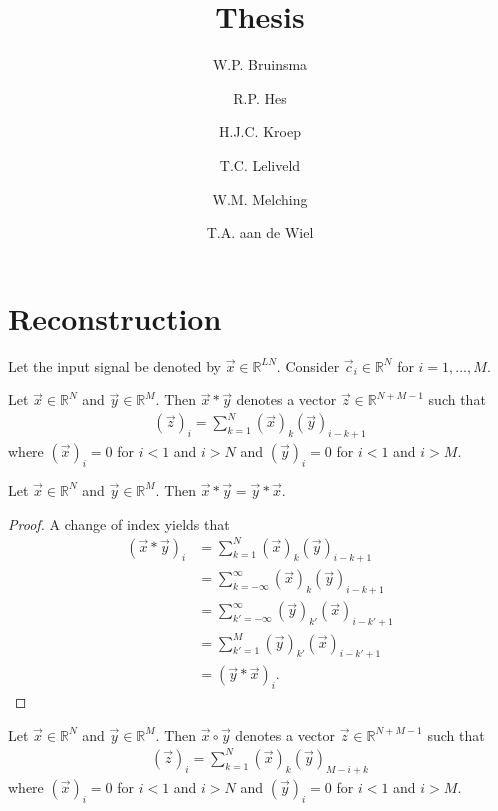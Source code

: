 \documentclass[a4paper, openany, oneside]{memoir}
\title{Thesis}
\author{W.P. Bruinsma \and R.P. Hes \and H.J.C. Kroep \and T.C. Leliveld \and W.M. Melching \and T.A. aan de Wiel}
\begin{document}
\frontmatter

\begin{titlingpage}
  \pagestyle{empty}
  \maketitle
\end{titlingpage}

\chapter{Reconstruction}
Let the input signal be denoted by $\vec{x} \in \mathbb{R}^{LN}$. Consider $\vec{c}_i \in \mathbb{R}^{N}$ for $i = 1,\ldots,M$.

\begin{definition}[Convolution]
    Let $\vec{x} \in \mathbb{R}^N$ and $\vec{y} \in \mathbb{R}^M$. Then $\vec{x} \ast \vec{y}$ denotes a vector $\vec{z} \in \mathbb{R}^{N+M-1}$ such that
    \begin{align*}
        (\vec{z})_i = \sum_{k=1}^{N} (\vec{x})_k (\vec{y})_{i-k+1}
    \end{align*}
    where $(\vec{x})_i=0$ for $i < 1$ and $i > N$ and $(\vec{y})_i=0$ for $i < 1$ and $i > M$.
\end{definition}

\begin{theorem}
    Let $\vec{x} \in \mathbb{R}^N$ and $\vec{y} \in \mathbb{R}^M$. Then $\vec{x} \ast \vec{y} = \vec{y} \ast \vec{x}$.
\end{theorem}
\begin{proof}
    A change of index yields that
    \begin{align*}
        (\vec{x} \ast \vec{y})_i &= \sum_{k=1}^{N} (\vec{x})_k (\vec{y})_{i-k+1} \\
        &= \sum_{k=-\infty}^{\infty} (\vec{x})_k (\vec{y})_{i-k+1} \\
        &= \sum_{k'=-\infty}^{\infty} (\vec{y})_{k'} (\vec{x})_{i-k'+1} \\
        &= \sum_{k'=1}^{M} (\vec{y})_{k'} (\vec{x})_{i-k'+1} \\
        &= (\vec{y} \ast \vec{x})_i.
    \end{align*}
\end{proof}

\begin{definition}[Correlation]
    Let $\vec{x} \in \mathbb{R}^N$ and $\vec{y} \in \mathbb{R}^M$. Then $\vec{x} \circ \vec{y}$ denotes a vector $\vec{z} \in \mathbb{R}^{N+M-1}$ such that
    \begin{align*}
        (\vec{z})_i = \sum_{k=1}^{N} (\vec{x})_k (\vec{y})_{M-i+k}
    \end{align*}
    where $(\vec{x})_i=0$ for $i < 1$ and $i > N$ and $(\vec{y})_i=0$ for $i < 1$ and $i > M$.
\end{definition}
\end{document}
